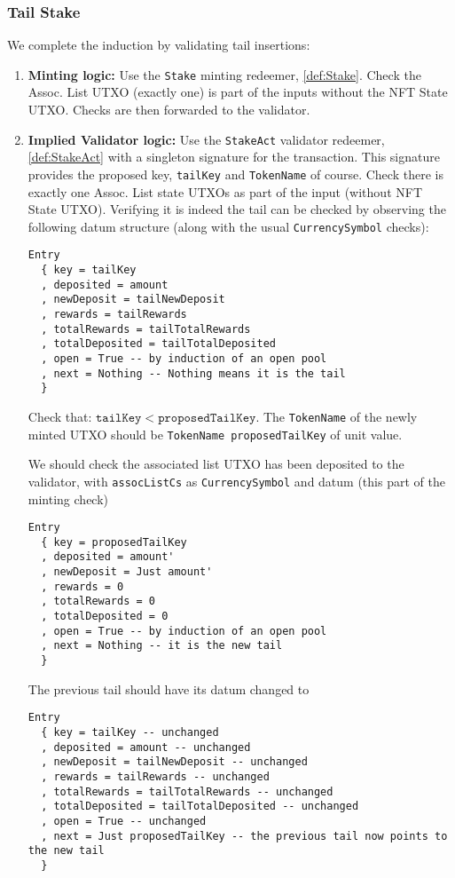 \documentclass[10pt, a4paper]{article}
\theoremstyle{definition}
\begin{document}
\subsubsection{Tail Stake}\label{subsubsection:TailStake}
We complete the induction by validating tail insertions:
\begin{enumerate}
\item{\textbf{Minting logic:} Use the \texttt{Stake} minting redeemer, \ref{def:Stake}. Check the Assoc. List UTXO (exactly one) is part of the inputs without the NFT State UTXO. Checks are then forwarded to the validator.
}

\item{\textbf{Implied Validator logic:} Use the \texttt{StakeAct} validator redeemer, \ref{def:StakeAct} with a singleton signature for the transaction. This signature provides the proposed key, \texttt{tailKey} and \texttt{TokenName} of course. Check there is exactly one Assoc. List state UTXOs as part of the input (without NFT State UTXO). Verifying it is indeed the tail can be checked by observing the following datum structure (along with the usual \texttt{CurrencySymbol} checks):
\begin{verbatim}
Entry
  { key = tailKey
  , deposited = amount
  , newDeposit = tailNewDeposit
  , rewards = tailRewards
  , totalRewards = tailTotalRewards
  , totalDeposited = tailTotalDeposited
  , open = True -- by induction of an open pool
  , next = Nothing -- Nothing means it is the tail
  }
\end{verbatim}

Check that: $\texttt{tailKey} < \texttt{proposedTailKey}.$ The \texttt{TokenName} of the newly minted UTXO should be \texttt{TokenName proposedTailKey} of unit value.

 We should check the associated list UTXO has been deposited to the validator, with \texttt{assocListCs} as \texttt{CurrencySymbol} and datum (this part of the minting check)
\begin{verbatim}
Entry
  { key = proposedTailKey
  , deposited = amount'
  , newDeposit = Just amount'
  , rewards = 0
  , totalRewards = 0 
  , totalDeposited = 0
  , open = True -- by induction of an open pool
  , next = Nothing -- it is the new tail
  }
\end{verbatim}

The previous tail should have its datum changed to \begin{verbatim}
Entry
  { key = tailKey -- unchanged
  , deposited = amount -- unchanged
  , newDeposit = tailNewDeposit -- unchanged
  , rewards = tailRewards -- unchanged
  , totalRewards = tailTotalRewards -- unchanged
  , totalDeposited = tailTotalDeposited -- unchanged
  , open = True -- unchanged
  , next = Just proposedTailKey -- the previous tail now points to the new tail
  }
\end{verbatim}

}
\end{enumerate}
\end{document}
